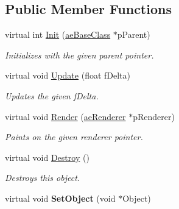 \subsection*{Public Member Functions}
\begin{DoxyCompactItemize}
\item 
virtual int \hyperlink{classae_sprite_renderer_a97a72a34026e64766a0ab4840376cd76}{Init} (\hyperlink{classae_base_class}{ae\+Base\+Class} $\ast$p\+Parent)
\begin{DoxyCompactList}\small\item\em Initializes with the given parent pointer. \end{DoxyCompactList}\item 
virtual void \hyperlink{classae_sprite_renderer_a65ea9a0ad3452271d2d5b8c140a7eff7}{Update} (float f\+Delta)
\begin{DoxyCompactList}\small\item\em Updates the given f\+Delta. \end{DoxyCompactList}\item 
virtual void \hyperlink{classae_sprite_renderer_a1583eea9478f23549cf9355091542d6a}{Render} (\hyperlink{classae_core_1_1ae_renderer}{ae\+Renderer} $\ast$p\+Renderer)
\begin{DoxyCompactList}\small\item\em Paints on the given renderer pointer. \end{DoxyCompactList}\item 
virtual void \hyperlink{classae_sprite_renderer_acba90289bfe989eda9480258fc679400}{Destroy} ()\hypertarget{classae_sprite_renderer_acba90289bfe989eda9480258fc679400}{}\label{classae_sprite_renderer_acba90289bfe989eda9480258fc679400}

\begin{DoxyCompactList}\small\item\em Destroys this object. \end{DoxyCompactList}\item 
virtual void {\bfseries Set\+Object} (void $\ast$Object)\hypertarget{classae_sprite_renderer_a398961d623fbcd4428a4f8ad815cf0b8}{}\label{classae_sprite_renderer_a398961d623fbcd4428a4f8ad815cf0b8}

\end{DoxyCompactItemize}
